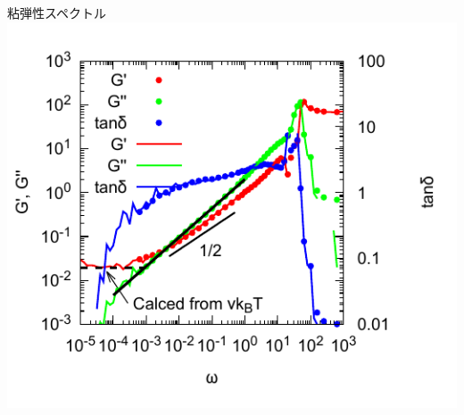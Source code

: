 \documentclass[aspectratio=169,11pt, dvipdfmx]{beamer}
\begin{document}
\begin{frame}
\begin{columns}[totalwidth=1\textwidth]
				\scriptsize
				粘弾性スペクトル
				\includegraphics[width=.9\textwidth]{N_44_Freq_Sweep.pdf}
		\end{columns}
\end{frame}
\end{document}
